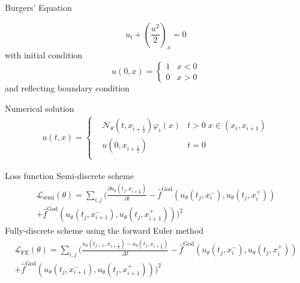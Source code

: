 \documentclass[aspectratio=169]{beamer}
\begin{document}
\begin{frame}{Burgers' Equation}

\begin{equation*}
 	u_t + (\frac{u^2}{2})_x = 0
 \end{equation*} 
with initial condition 
 \begin{equation*}
 	u(0,x) = \left\{
 	\begin{matrix}
 		1 & x<0\\
 		 0 & x>0
 	\end{matrix}
 	\right.
 \end{equation*}
and reflecting boundary condition

\medskip

Numerical solution
\begin{equation*}
\begin{aligned}
u(t,x) = \left\{\begin{matrix}
&\mathcal{N}_\theta(t,x_{i+\frac{1}{2}}) \varphi_i(x) &  t > 0 \; x\in(x_i,x_{i+1})\\
&u(0,x_{i+\frac{1}{2}}) &  t = 0 \\
\end{matrix}\right.
\end{aligned}
\end{equation*}

\end{frame}

\begin{frame}{Loss function}
Semi-discrete scheme
\begin{multline*}
\mathcal{L}_{\mathrm{semi}}(\theta) =  \sum_{i,j} \bigg( \frac{\partial u_{\theta}(t_j,x_{i+\frac{1}{2}})}{\partial t} - \hat{f}^{\mathrm{God}}(u_{\theta}(t_j,x^-_i),u_{\theta}(t_j,x^+_i)) \\
+\hat{f}^{\mathrm{God}}(u_{\theta}(t_j,x^-_{i+1}),u_{\theta}(t_j,x^+_{i+1}))  \bigg)^2
\end{multline*}
Fully-discrete scheme using the forward Euler method
\begin{multline*}
\mathcal{L}_{\mathrm{FE}}(\theta) = \sum_{i,j} \bigg( \frac{u_{\theta}(t_{j+1},x_{i+\frac{1}{2}})-u_{\theta}(t_j,x_{i+\frac{1}{2}})}{\Delta t} - \hat{f}^{\mathrm{God}}(u_{\theta}(t_j,x^-_i),u_{\theta}(t_j,x^+_i)) \\
+\hat{f}^{\mathrm{God}}(u_{\theta}(t_j,x^-_{i+1}),u_{\theta}(t_j,x^+_{i+1}))  \bigg)^2
\end{multline*}
\end{frame}
\end{document}

